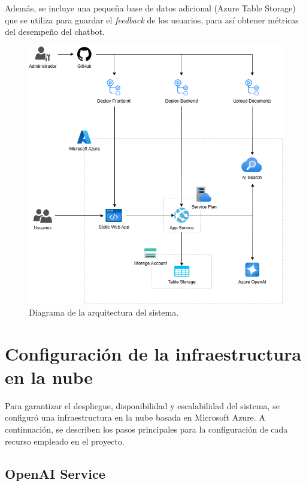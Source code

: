 Además, se incluye una pequeña base de datos adicional (Azure Table Storage) que se utiliza para guardar el \textit{feedback} de los usuarios, 
para así obtener métricas del desempeño del chatbot.  

\begin{figure}[ht]
	\centering
	\includegraphics[scale=.3]{./Figures/arquitectura.png}
	\caption{Diagrama de la arquitectura del sistema.}
	\label{fig:architecture}
\end{figure}
 
\section{Configuración de la infraestructura en la nube}

Para garantizar el despliegue, disponibilidad y escalabilidad del sistema, se configuró una infraestructura en la nube basada en Microsoft Azure. 
A continuación, se describen los pasos principales para la configuración de cada recurso empleado en el proyecto.

\subsection{OpenAI Service}


